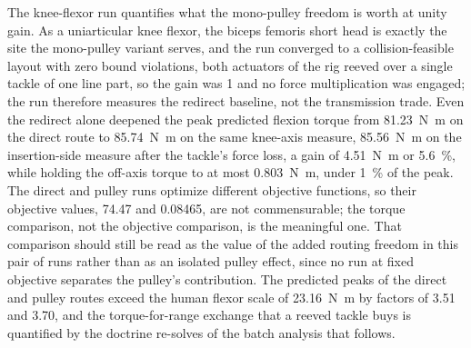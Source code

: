 \documentclass[utf8]{FrontiersinHarvard} %
\begin{document}
The knee-flexor run quantifies what the mono-pulley freedom is worth at unity gain. As a uniarticular knee flexor, the biceps femoris short head is exactly the site the mono-pulley variant serves, and the run converged to a collision-feasible layout with zero bound violations, both actuators of the rig reeved over a single tackle of one line part, so the gain was 1 and no force multiplication was engaged; the run therefore measures the redirect baseline, not the transmission trade. Even the redirect alone deepened the peak predicted flexion torque from \qty{81.23}{\newton\meter} on the direct route to \qty{85.74}{\newton\meter} on the same knee-axis measure, \qty{85.56}{\newton\meter} on the insertion-side measure after the tackle's force loss, a gain of \qty{4.51}{\newton\meter} or \qty{5.6}{\percent}, while holding the off-axis torque to at most \qty{0.803}{\newton\meter}, under \qty{1}{\percent} of the peak. The direct and pulley runs optimize different objective functions, so their objective values, 74.47 and 0.08465, are not commensurable; the torque comparison, not the objective comparison, is the meaningful one. That comparison should still be read as the value of the added routing freedom in this pair of runs rather than as an isolated pulley effect, since no run at fixed objective separates the pulley's contribution. The predicted peaks of the direct and pulley routes exceed the human flexor scale of \qty{23.16}{\newton\meter} by factors of 3.51 and 3.70, and the torque-for-range exchange that a reeved tackle buys is quantified by the doctrine re-solves of the batch analysis that follows.
\end{document}
